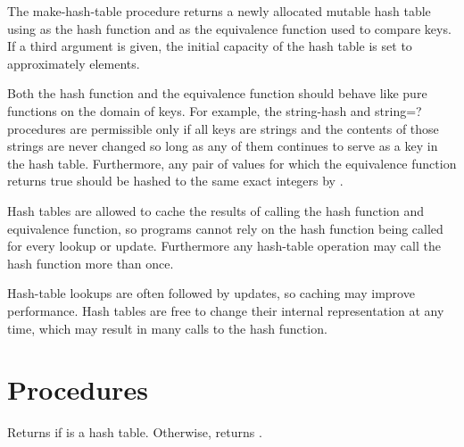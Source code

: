 \begin{entry}{%
}

The {\cf make-hash-table} procedure returns a newly allocated mutable
hash table using  
as the hash function and  as the equivalence function used to 
compare keys.
If a third argument is given, the 
initial capacity of the hash table is set to approximately  elements.

Both the hash function  and the equivalence
function  should behave like pure functions
on the domain of keys.  For example, the {\cf string-hash}
and {\cf string=?} procedures are permissible only if all
keys are strings and the contents of those strings are never
changed so long as any of them continues to serve as a key in
the hash table.  Furthermore, any pair of values for which
the equivalence function  returns true should
be hashed to the same exact integers by 
.

\begin{note}
Hash tables are allowed to cache the results of calling the
hash function and equivalence function, so programs cannot
rely on the hash function being called for every lookup or
update.  Furthermore any hash-table operation may call the
hash function more than once.
\end{note}

\begin{rationale}
Hash-table lookups are often followed by updates, so caching
may improve performance.  Hash tables are free to change
their internal representation at any time, which may result
in many calls to the hash function.
\end{rationale}

\end{entry}

\section{Procedures}

\begin{entry}{%
}

Returns \schtrue{} if  is a hash table.
Otherwise, returns \schfalse{}.
\end{entry}

